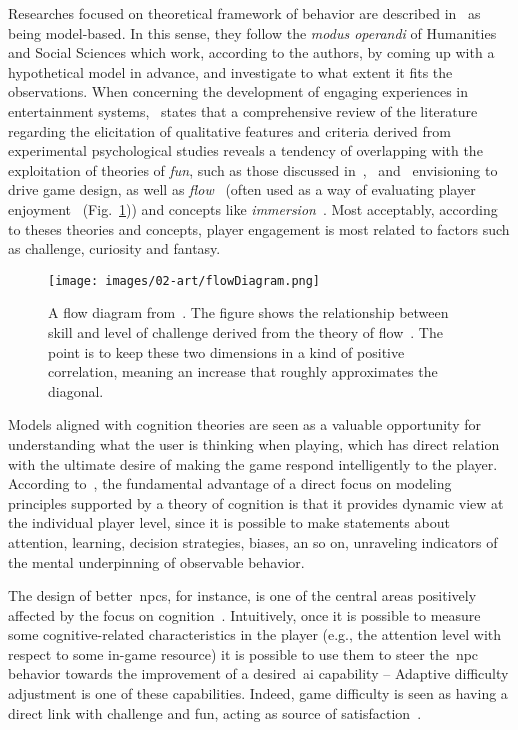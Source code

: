 Researches focused on theoretical framework of behavior are described in~\cite{yannakakis_player_2013} as being model-based. In this sense, they follow the \textit{modus operandi} of Humanities and Social Sciences which work, according to the authors, by coming up with a hypothetical model in advance, and investigate to what extent it fits the observations. When concerning the development of engaging experiences in entertainment systems,~\cite{yannakakis_how_2008} states that a comprehensive review of the literature regarding the elicitation of qualitative features and criteria derived from experimental psychological studies reveals a tendency of overlapping with the exploitation of theories of \textit{fun}, such as those discussed in~\cite{malone_what_1980},~\cite{lazzaro_why_2004} and~\cite{koster_theory_2013} envisioning to drive game design, as well as \textit{flow}~\citep{csikszentmihalyi_flow:_1991} (often used as a way of evaluating player enjoyment~\citep{sweetser_gameflow:_2005, cowley_toward_2008} (Fig.~\ref{flowDiagram})) and concepts like \textit{immersion}~\citep{calleja_digital_2007}. Most acceptably, according to theses theories and concepts, player engagement is most related to factors such as challenge, curiosity and fantasy.

\begin{figure}[htp]
  \centering  
  \texttt{[image: images/02-art/flowDiagram.png]}
  \caption{A flow diagram from~\cite{hunicke_ai_2004}. The figure shows the relationship between skill and level of challenge derived from the theory of flow~\citep{csikszentmihalyi_flow:_1991}. The point is to keep these two dimensions in a kind of positive correlation, meaning an increase that roughly approximates the diagonal.}
  \label{flowDiagram}
\end{figure}

Models aligned with cognition theories are seen as a valuable opportunity for understanding what the user is thinking when playing, which has direct relation with the ultimate desire of making the game respond intelligently to the player. According to~\cite{bohil_cognitive_2007}, the fundamental advantage of a direct focus on modeling principles supported by a theory of cognition is that it provides dynamic view at the individual player level, since it is possible to make statements about attention, learning, decision strategies, biases, an so on, unraveling indicators of the mental underpinning of observable behavior. 

The design of better~\gls{npc}s, for instance, is one of the central areas positively affected by the focus on cognition~\citep{funge_ai_1999}. Intuitively, once it is possible to measure some cognitive-related characteristics in the player (e.g., the attention level with respect to some in-game resource) it is possible to use them to steer the~\gls{npc} behavior towards the improvement of a desired~\gls{ai} capability -- Adaptive difficulty adjustment is one of these capabilities. Indeed, game difficulty is seen as having a direct link with challenge and fun, acting as source of satisfaction~\citep{koster_theory_2013,yannakakis_modeling_2006}. 

